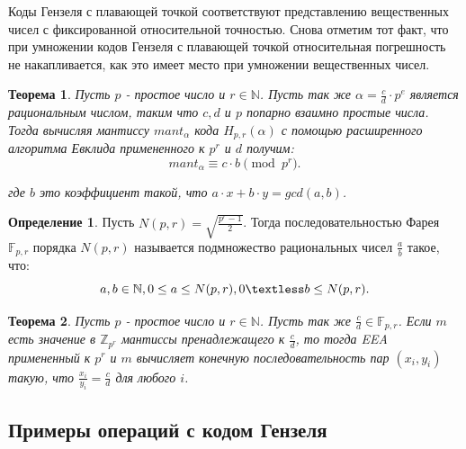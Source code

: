 \documentclass[master, och, diploma, times]{sty/SCWorks}
\theoremstyle{plain}
\newtheorem{thethm}{Теорема}[section]
\theoremstyle{definition}
\newtheorem{defn}{Определение}[section]
\begin{document}
Коды Гензеля с плавающей точкой соответствуют представлению вещественных чисел с фиксированной относительной точностью. Снова отметим тот факт, что при умножении кодов Гензеля с плавающей точкой относительная погрешность не накапливается, как это имеет место при умножении вещественных чисел.



\begin{thethm}
Пусть $p$ - простое число и $r \in \mathbb{N}$. Пусть так же $\alpha=\frac{c}{d} \cdot p^e$ является рациональным числом, таким что $c, d$ и $p$ попарно взаимно простые числа. Тогда вычисляя мантиссу $mant_{\alpha}$ кода $H_{p,r}(\alpha)$ с помощью расширенного алгоритма Евклида примененного к $p^r$ и $d$ получим:
$$
mant_{\alpha} \equiv c \cdot b \pmod {p^r}.
$$

\noindent где $b$ это коэффициент такой, что $a\cdot x+b\cdot y = gcd(a,b)$.

\end{thethm}


\begin{defn}
Пусть $N(p, r)=\sqrt{\frac{p^r-1}{2}}$. Тогда последовательностью Фарея $\mathbb{F}_{p,r}$ порядка $N(p, r)$ называется подмножество рациональных чисел $\frac{a}{b}$ такое, что:
$$
a, b \in \mathbb{N}, 0 \leq a \leq N(p, r), 0 \textless b \leq N(p, r).
$$
\end{defn}



\begin{thethm}
Пусть $p$ - простое число и $r \in \mathbb{N}$. Пусть так же $\frac{c}{d} \in \mathbb{F}_{p,r}$. Если $m$ есть значение в $\mathbb{Z}_{p^r}$ мантиссы пренадлежащего к $\frac{c}{d}$, то тогда EEA примененный к $p^r$ и $m$ вычисляет конечную последовательность пар $(x_i, y_i)$ такую, что $\frac{x_i}{y_i}=\frac{c}{d}$ для любого $i$.
\end{thethm}



\subsection{Примеры операций с кодом Гензеля}
\end{document}
